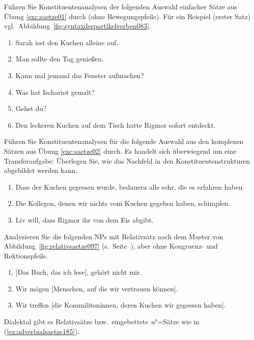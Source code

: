  \label{exc:saetze03} Führen Sie Konstituentenanalysen der folgenden Auswahl einfacher Sätze aus Übung \ref{exc:saetze01} durch (ohne Bewegungspfeile).
Für ein Beispiel (erster Satz) vgl.\ Abbildung~\ref{fig:syntaxderpartikelverben083}.

\begin{enumerate}
  \item{Sarah isst den Kuchen alleine auf.}
  \item{Man sollte den Tag genießen.}
  \item{Kann mal jemand das Fenster aufmachen?}
  \item{Was hat Ischariot gemalt?}
  \item{Gehst du?}
  \item{Den leckeren Kuchen auf dem Tisch hatte Rigmor sofort entdeckt.}
\end{enumerate}

 \label{exc:saetze04} Führen Sie Konstituentenanalysen für die folgende Auswahl aus den komplexen Sätzen aus Übung \ref{exc:saetze02} durch.
Es handelt sich überwiegend um eine Transferaufgabe:
Überlegen Sie, wie das Nachfeld in den Konstituentenstrukturen abgebildet werden kann.

\begin{enumerate}
  \item Dass der Kuchen gegessen wurde, bedauern alle sehr, die es erfahren haben.
  \item Die Kollegen, denen wir nichts vom Kuchen gegeben haben, schimpfen.
  \item Liv will, dass Rigmor ihr von dem Eis abgibt.
\end{enumerate}

 \label{exc:saetze05} Analysieren Sie die folgenden NPs mit Relativsatz nach dem Muster von Abbildung~\ref{fig:relativsaetze097} (s.\ Seite~\pageref{fig:relativsaetze097}), aber ohne Kongruenz- und Rektionspfeile.

\begin{enumerate}
  \item{[Das Buch, das ich lese], gehört nicht mir.}
  \item Wir mögen [Menschen, auf die wir vertrauen können].
  \item Wir treffen [die Kommilitoninnen, deren Kuchen wir gegessen haben].
\end{enumerate}

 \label{exc:saetze06} Dialektal gibt es Relativsätze bzw.\ eingebettete \textit{w}"=Sätze wie in (\ref{ex:adverbialsaetze185}).

